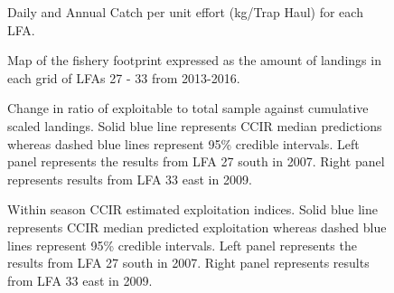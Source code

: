 \documentclass[11pt]{article}
\newcommand{\D}{.}
\newcommand{\e}{/bio_data/bio.lobster/figures/LFA2733Framework2018} %
\begin{document}
\begin{landscape}
\begin{figure}
\centering
    \caption{Daily and Annual Catch per unit effort (kg/Trap Haul) for each LFA.}

\end{figure}

        \begin{figure}
        \centering
        
         \caption{Map of the fishery footprint expressed as the amount of landings in each grid of LFAs 27 - 33 from 2013-2016.}
        \end{figure}


\iffalse


\begin{figure}
\centering
              \caption{Change in ratio of exploitable to total sample against cumulative scaled landings. Solid blue line represents CCIR median predictions whereas dashed blue lines represent 95\% credible intervals. Left panel represents the results from LFA 27 south in 2007. Right panel represents results from LFA 33 east in 2009.}
\end{figure}


\begin{figure}
\centering
             \caption{Within season CCIR estimated exploitation indices. Solid blue line represents CCIR median predicted exploitation whereas dashed blue lines represent 95\% credible intervals. Left panel represents the results from LFA 27 south in 2007. Right panel represents results from LFA 33 east in 2009.}
\end{figure}


\end{landscape}
\end{document}
